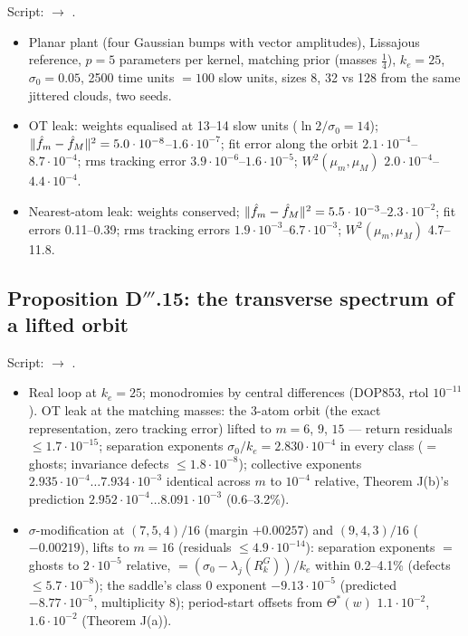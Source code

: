 Script:  $\to$ .
\begin{itemize}
  \item Planar plant (four Gaussian bumps with vector amplitudes), Lissajous reference, $p=5$ parameters per kernel,
    matching prior (masses $\frac14$), $k_e=25$, $\sigma_0=0.05$, 2500 time units ${}=100$ slow units, sizes 8, 32 vs
    128 from the same jittered clouds, two seeds.
  \item OT leak: weights equalised at 13--14 slow units ($\ln2/\sigma_0=14$);
    $\lVert \hat f_m-\hat f_M\rVert^2=5.0\cdot10^{-8}$--$1.6\cdot10^{-7}$; fit error along the orbit
    $2.1\cdot10^{-4}$--$8.7\cdot10^{-4}$; rms tracking error $3.9\cdot10^{-6}$--$1.6\cdot10^{-5}$;
    $W^2(\mu_m,\mu_M)$ $2.0\cdot10^{-4}$--$4.4\cdot10^{-4}$.
  \item Nearest-atom leak: weights conserved; $\lVert \hat f_m-\hat f_M\rVert^2=5.5\cdot10^{-3}$--$2.3\cdot10^{-2}$; fit
    errors 0.11--0.39; rms tracking errors $1.9\cdot10^{-3}$--$6.7\cdot10^{-3}$; $W^2(\mu_m,\mu_M)$ 4.7--11.8.
\end{itemize}

\subsection{Proposition D\texorpdfstring{$'''$}{'''}.15: the transverse spectrum of a lifted orbit}

Script:  $\to$ .
\begin{itemize}
  \item Real loop at $k_e=25$; monodromies by central differences (DOP853, rtol $10^{-11}$). OT leak at the matching
    masses: the 3-atom orbit (the exact representation, zero tracking error) lifted to $m=6$, $9$, $15$ --- return
    residuals $\le1.7\cdot10^{-15}$; separation exponents $\sigma_0/k_e=2.830\cdot10^{-4}$ in every class ($=$
    ghosts; invariance defects $\le1.8\cdot10^{-8}$); collective exponents $2.935\cdot10^{-4}\dots7.934\cdot10^{-3}$
    identical across $m$ to $10^{-4}$ relative, Theorem J(b)'s prediction $2.952\cdot10^{-4}\dots8.091\cdot10^{-3}$
    (0.6--3.2\%).
  \item $\sigma$-modification at $(7,5,4)/16$ (margin $+0.00257$) and $(9,4,3)/16$ ($-0.00219$), lifts to $m=16$
    (residuals $\le4.9\cdot10^{-14}$): separation exponents $=$ ghosts to $2\cdot10^{-5}$ relative,
    $=(\sigma_0-\lambda_j(R^G_k))/k_e$ within 0.2--4.1\% (defects $\le5.7\cdot10^{-8}$); the saddle's class 0
    exponent $-9.13\cdot10^{-5}$ (predicted $-8.77\cdot10^{-5}$, multiplicity 8); period-start offsets from
    $\Theta^*(w)$ $1.1\cdot10^{-2}$, $1.6\cdot10^{-2}$ (Theorem J(a)).
\end{itemize}


